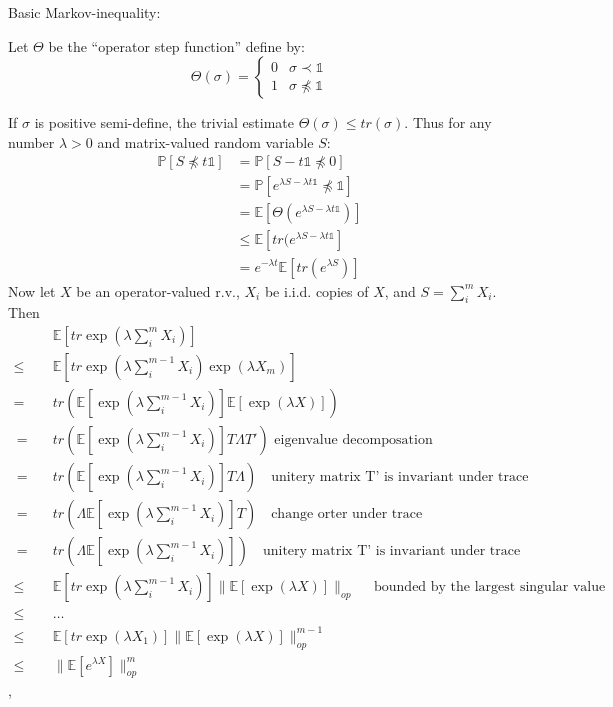 \documentclass{article}
\begin{document}
Basic Markov-inequality:

Let $\Theta$ be the ``operator step function'' define by:
\[
\Theta(\sigma)= \left\{\begin{array}{lr}
0 & \sigma \prec \mathbb{1}\\
1 & \sigma \not\preceq	\mathbb{1}
\end{array}\right.
\]

If $\sigma$ is positive semi-define, the trivial estimate $\Theta(\sigma) \le tr (\sigma)$. Thus for any number $\lambda >0$ and matrix-valued random variable $S$:
\begin{equation}
\begin{aligned}
\mathbb{P}[S\not\preceq t\mathbb{1}] 
& = \mathbb{P}\left[S-t\mathbb{1}\not\preceq 0\right]\\
& = \mathbb{P}\left[e^{\lambda S-\lambda t \mathbb{1}} \not\preceq \mathbb{1}\right]\\
& = \mathbb{E}\left[\Theta(e^{\lambda S-\lambda t \mathbb{1}})\right]\\
&\le\mathbb{E}\left[tr(e^{\lambda S-\lambda t \mathbb{1}}\right] \\
& = e^{-\lambda t} \mathbb{E}\left[tr(e^{\lambda S})\right]
\end{aligned}
\label{eq:22}
\end{equation}
Now let $X$ be an operator-valued r.v., $X_i$ be i.i.d. copies of $X$, and $S = \sum_i^m X_i$. Then
\begin{equation}
\begin{aligned}
&\quad \mathbb{E}\left[tr \exp\left(\lambda\sum_i^m X_i\right)\right]\\
\le & \quad \mathbb{E}\left[tr \exp\left(\lambda\sum_i^{m-1} X_i\right)\exp\left(\lambda X_m\right)\right ]\\
= & \quad tr \left( \mathbb{E} \left[ \exp \left( \lambda\sum_i^{m-1} X_i\right)\right]  \mathbb{E} \left[\exp(\lambda X)\right]\right)\\
\ = & \quad tr \left(\mathbb{E}\left[\exp\left(\lambda\sum_i^{m-1}X_i\right)\right]T\Lambda T'\right) \text{  eigenvalue decomposation}\\
\ = & \quad tr \left(\mathbb{E}\left[\exp\left(\lambda\sum_i^{m-1}X_i\right)\right]T\Lambda \right) \quad\text{unitery matrix T' is invariant under trace}\\
\ = & \quad tr \left(\Lambda\mathbb{E}\left[\exp\left(\lambda\sum_i^{m-1}X_i\right)\right]T \right) \quad\text{change orter under trace}\\
\ = & \quad tr \left(\Lambda \mathbb{E}\left[\exp\left(\lambda\sum_i^{m-1}X_i\right)\right]\right) \quad \text{unitery matrix T' is invariant under trace}\\
\le & \quad \mathbb{E}\left[ tr \exp \left( \lambda \sum_i^{m-1} X_i\right)\right] \|\mathbb{E}[\exp(\lambda X)]\|_{op} \quad \text{ bounded by the largest singular value}\\
\le & \quad  \dots \\
\le & \quad \mathbb{E}[tr \exp(\lambda X_1)]\|\mathbb{E}[\exp(\lambda X)]\|_{op}^{m-1}\\
\le & \quad \|\mathbb{E}[e^{\lambda X}]\|_{op}^m
\end{aligned}
\label{eq:23}
\end{equation},
\end{document}
